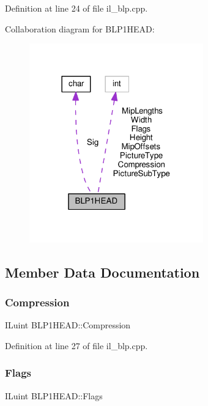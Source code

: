 Definition at line 24 of file il\+\_\+blp.\+cpp.



Collaboration diagram for B\+L\+P1\+H\+E\+AD\+:
\nopagebreak
\begin{figure}[H]
\begin{center}
\leavevmode
\includegraphics[width=213pt]{db/d1e/structBLP1HEAD__coll__graph}
\end{center}
\end{figure}


\subsection{Member Data Documentation}
\mbox{\label{structBLP1HEAD_aee84bf8cac13d1d47688e60f85b29826}} 
\subsubsection{\texorpdfstring{Compression}{Compression}}
{\footnotesize\ttfamily I\+Luint B\+L\+P1\+H\+E\+A\+D\+::\+Compression}



Definition at line 27 of file il\+\_\+blp.\+cpp.

\mbox{\label{structBLP1HEAD_acd1877a91155a98b61f3ad3288f5c7e8}} 
\subsubsection{\texorpdfstring{Flags}{Flags}}
{\footnotesize\ttfamily I\+Luint B\+L\+P1\+H\+E\+A\+D\+::\+Flags}



